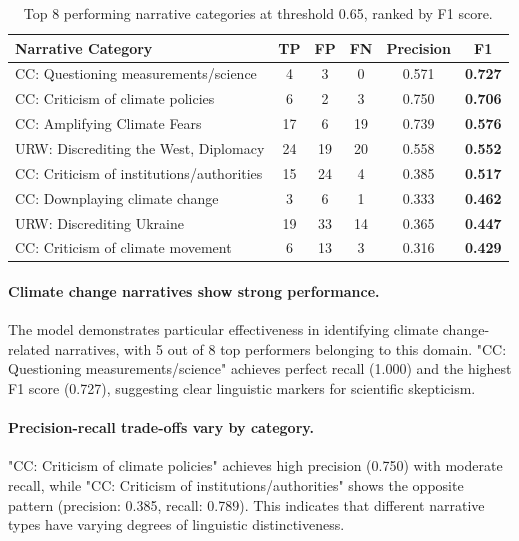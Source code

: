 \begin{table}[htbp]
\centering
\caption{Top 8 performing narrative categories at threshold 0.65, ranked by F1 score.}
\label{tab:top-narratives}
\begin{tabular}{lccccc}
\toprule
\textbf{Narrative Category} & \textbf{TP} & \textbf{FP} & \textbf{FN} & \textbf{Precision} & \textbf{F1} \\
\midrule
CC: Questioning measurements/science & 4 & 3 & 0 & 0.571 & \textbf{0.727} \\
CC: Criticism of climate policies & 6 & 2 & 3 & 0.750 & \textbf{0.706} \\
CC: Amplifying Climate Fears & 17 & 6 & 19 & 0.739 & \textbf{0.576} \\
URW: Discrediting the West, Diplomacy & 24 & 19 & 20 & 0.558 & \textbf{0.552} \\
CC: Criticism of institutions/authorities & 15 & 24 & 4 & 0.385 & \textbf{0.517} \\
CC: Downplaying climate change & 3 & 6 & 1 & 0.333 & \textbf{0.462} \\
URW: Discrediting Ukraine & 19 & 33 & 14 & 0.365 & \textbf{0.447} \\
CC: Criticism of climate movement & 6 & 13 & 3 & 0.316 & \textbf{0.429} \\
\bottomrule
\end{tabular}
\end{table}

\paragraph{Climate change narratives show strong performance.} The model demonstrates particular effectiveness in identifying climate change-related narratives, with 5 out of 8 top performers belonging to this domain. "CC: Questioning measurements/science" achieves perfect recall (1.000) and the highest F1 score (0.727), suggesting clear linguistic markers for scientific skepticism.

\paragraph{Precision-recall trade-offs vary by category.} "CC: Criticism of climate policies" achieves high precision (0.750) with moderate recall, while "CC: Criticism of institutions/authorities" shows the opposite pattern (precision: 0.385, recall: 0.789). This indicates that different narrative types have varying degrees of linguistic distinctiveness.


